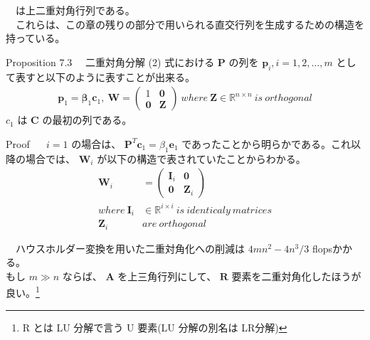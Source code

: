 \documentclass[a4paper,10pt]{jarticle}
\begin{document}
　は上二重対角行列である。\\
　これらは、この章の残りの部分で用いられる直交行列を生成するための構造を持っている。\\
\begin{itembox}[l]{Proposition 7.3}
　二重対角分解 (2) 式における $\bm{P}$ の列を $\bm{p}_i,i=1,2,\dots,m$ として表すと以下のように表すことが出来る。
\begin{align*}
\bm{p}_1 = \bm{\beta}_1 \bm{c}_1,\ \bm{W} = 
\begin{pmatrix}
1 & \bm{0}\\
\bm{0} & \bm{Z}
\end{pmatrix}
\ where\ \bm{Z}\in\mathbb{R}^{n \times n}\ is\ orthogonal
\end{align*}
$c_1$ は $\bm{C}$ の最初の列である。
\end{itembox}
\begin{itembox}[l]{Proof}
　 $i = 1$ の場合は、 $\bm{P}^T \bm{c}_1 = \beta_1 \bm{e}_1$ であったことから明らかである。これ以降の場合では、 $\bm{W}_i$ が以下の構造で表されていたことからわかる。
\begin{align*}
\bm{W}_i &=
\begin{pmatrix}
\bm{I}_i & \bm{0}\\
\bm{0} & \bm{Z}_i 
\end{pmatrix} \\
where\ \bm{I}_i &\in \mathbb{R}^{i \times i}\ is\ identicaly\ matrices \\
\bm{Z}_i &are \ orthogonal
\end{align*}
\end{itembox}

　ハウスホルダー変換を用いた二重対角化への削減は \(4mn^2 - 4n^3 / 3\) flopsかかる。\\
もし \(m \gg n\) ならば、 \(\bm{A}\) を上三角行列にして、 \(\bm{R}\) 要素を二重対角化したほうが良い。\footnote{R とは LU 分解で言う U 要素(LU 分解の別名は LR分解)}\\
\end{document}
